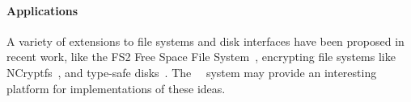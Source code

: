 \paragraph{Applications}

A variety of extensions to file systems and disk interfaces have been proposed
in recent work, like the FS2 Free Space File System~\cite{huang05fs2},
encrypting file systems like NCryptfs~\cite{wright03ncryptfs}, and type-safe
disks~\cite{sivathanu06typesafe}. The \Kudos\
\module\ system may provide an interesting platform for implementations 
of these ideas.
